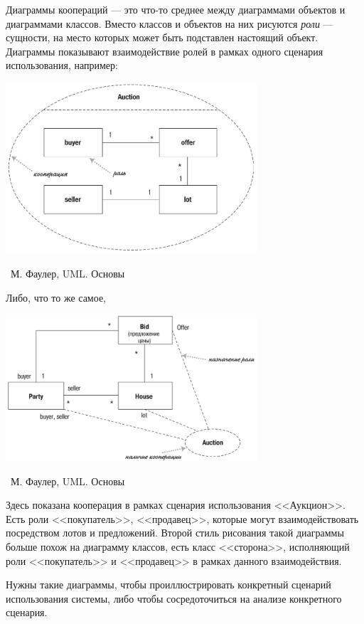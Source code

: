 \documentclass[a5paper]{article}
\newcommand{\attribution}[1] {
	\vspace{-5mm}\begin{flushright}\begin{scriptsize}%
	{\textcopyright\, #1}\end{scriptsize}\end{flushright}
}
\begin{document}
Диаграммы коопераций --- это что-то среднее между диаграммами объектов и диаграммами классов. Вместо классов и объектов на них рисуются \textit{роли} --- сущности, на место которых может быть подставлен настоящий объект. Диаграммы показывают взаимодействие ролей в рамках одного сценария использования, например:

\begin{center}
	\includegraphics[width=0.7\textwidth]{cooperationDiagram.png}
	\attribution{М. Фаулер, UML. Основы}
\end{center}

Либо, что то же самое,

\begin{center}
	\includegraphics[width=0.7\textwidth]{cooperationAlternateNotation.png}
	\attribution{М. Фаулер, UML. Основы}
\end{center}

Здесь показана кооперация в рамках сценария использования <<Аукцион>>. Есть роли <<покупатель>>, <<продавец>>, которые могут взаимодействовать посредством лотов и предложений. Второй стиль рисования такой диаграммы больше похож на диаграмму классов, есть класс <<сторона>>, исполняющий роли <<покупатель>> и <<продавец>> в рамках данного взаимодействия.

Нужны такие диаграммы, чтобы проиллюстрировать конкретный сценарий использования системы, либо чтобы сосредоточиться на анализе конкретного сценария.
\end{document}
